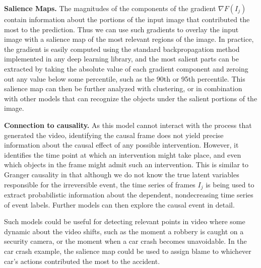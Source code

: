 \documentclass[letterpaper, twocolumn]{article} %
\begin{document}
\noindent \textbf{Salience Maps.} The magnitudes of the components of the gradient $\nabla F(I_j)$ contain information about the portions of the input image that contributed the most to the prediction. Thus we can use such gradients to overlay the input image with a salience map of the most relevant regions of the image. In practice, the gradient is easily computed using the standard backpropagation method implemented in any deep learning library, and the most salient parts can be extracted by taking the absolute value of each gradient component and zeroing out any value below some percentile, such as the 90th or 95th percentile. This salience map can then be further analyzed with clustering, or in combination with other models that can recognize the objects under the salient portions of the image.

\noindent \textbf{Connection to causality.} As this model cannot interact with the process that generated the video, identifying the causal frame does not yield precise information about the causal effect of any possible intervention. However, it identifies the time point at which an intervention might take place, and even which objects in the frame might admit such an intervention. This is similar to Granger causality in that although we do not know the true latent variables responsible for the irreversible event,  the time series of frames $I_j$ is being used to extract probabilistic information about the dependent, nondecreasing time series of event labels. Further models can then explore the causal event in detail. 

Such models could be useful for detecting relevant points in video where some dynamic about the video shifts, such as the moment a robbery is caught on a security camera, or the moment when a car crash becomes unavoidable. In the car crash example, the salience map could be used to assign blame to whichever car's actions contributed the most to the accident.
\end{document}

